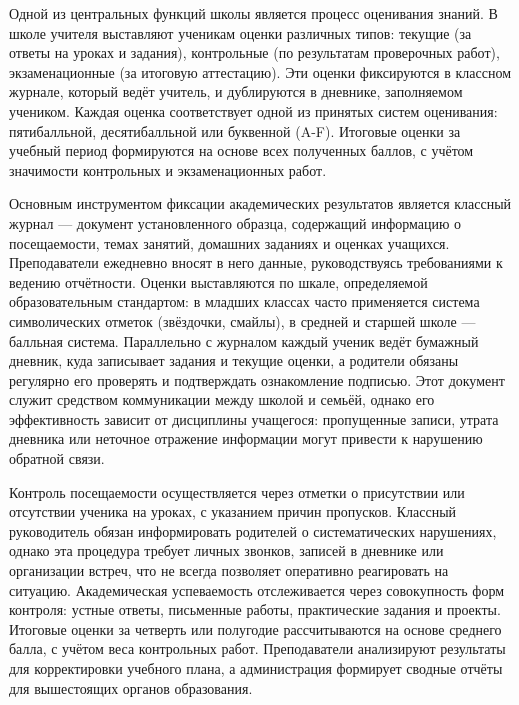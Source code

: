 \documentclass[a4paper, final]{article}
\begin{document}

Одной из центральных функций школы является процесс оценивания знаний. В школе учителя выставляют ученикам оценки различных типов: текущие (за ответы на уроках и задания), контрольные (по результатам проверочных работ), экзаменационные (за итоговую аттестацию). Эти оценки фиксируются в классном журнале, который ведёт учитель, и дублируются в дневнике, заполняемом учеником. Каждая оценка соответствует одной из принятых систем оценивания: пятибалльной, десятибалльной или буквенной (A-F). Итоговые оценки за учебный период формируются на основе всех полученных баллов, с учётом значимости контрольных и экзаменационных работ.

Основным инструментом фиксации академических результатов является классный журнал --- документ установленного образца, содержащий информацию о посещаемости, темах занятий, домашних заданиях и оценках учащихся. Преподаватели ежедневно вносят в него данные, руководствуясь требованиями к ведению отчётности. Оценки выставляются по шкале, определяемой образовательным стандартом: в младших классах часто применяется система символических отметок (звёздочки, смайлы), в средней и старшей школе --- балльная система. Параллельно с журналом каждый ученик ведёт бумажный дневник, куда записывает задания и текущие оценки, а родители обязаны регулярно его проверять и подтверждать ознакомление подписью. Этот документ служит средством коммуникации между школой и семьёй, однако его эффективность зависит от дисциплины учащегося: пропущенные записи, утрата дневника или неточное отражение информации могут привести к нарушению обратной связи.

Контроль посещаемости осуществляется через отметки о присутствии или отсутствии ученика на уроках, с указанием причин пропусков. Классный руководитель обязан информировать родителей о систематических нарушениях, однако эта процедура требует личных звонков, записей в дневнике или организации встреч, что не всегда позволяет оперативно реагировать на ситуацию. Академическая успеваемость отслеживается через совокупность форм контроля: устные ответы, письменные работы, практические задания и проекты. Итоговые оценки за четверть или полугодие рассчитываются на основе среднего балла, с учётом веса контрольных работ. Преподаватели анализируют результаты для корректировки учебного плана, а администрация формирует сводные отчёты для вышестоящих органов образования.
\end{document}
